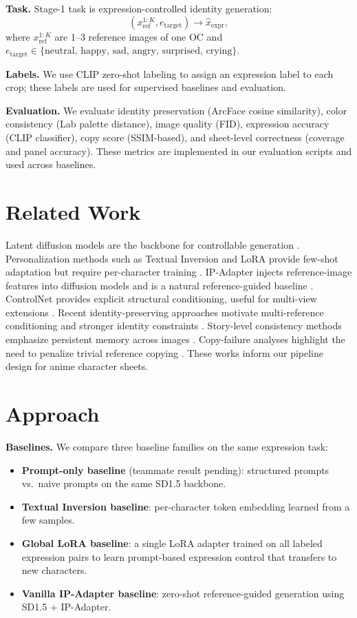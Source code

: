 \documentclass[twocolumn,11pt]{article}
\begin{document}
\textbf{Task.} Stage-1 task is expression-controlled identity generation:
\[
(x_{\mathrm{ref}}^{1:K}, e_{\mathrm{target}})\rightarrow \hat{x}_{\mathrm{expr}},
\]
where $x_{\mathrm{ref}}^{1:K}$ are 1--3 reference images of one OC and $e_{\mathrm{target}} \in \{\text{neutral, happy, sad, angry, surprised, crying}\}$.

\textbf{Labels.} We use CLIP zero-shot labeling to assign an expression label to each crop; these labels are used for supervised baselines and evaluation.

\textbf{Evaluation.} We evaluate identity preservation (ArcFace cosine similarity), color consistency (Lab palette distance), image quality (FID), expression accuracy (CLIP classifier), copy score (SSIM-based), and sheet-level correctness (coverage and panel accuracy). These metrics are implemented in our evaluation scripts and used across baselines.

\section{Related Work}
Latent diffusion models are the backbone for controllable generation \citep{rombach2022latent}. Personalization methods such as Textual Inversion and LoRA provide few-shot adaptation but require per-character training \citep{gal2022textual,hu2022lora}. IP-Adapter injects reference-image features into diffusion models and is a natural reference-guided baseline \citep{ye2023ipadapter}. ControlNet provides explicit structural conditioning, useful for multi-view extensions \citep{zhang2023controlnet}. Recent identity-preserving approaches motivate multi-reference conditioning and stronger identity constraints \citep{li2024photomaker,guo2024pulid,ma2024characteradapter}. Story-level consistency methods emphasize persistent memory across images \citep{zhou2024storydiffusion}. Copy-failure analyses highlight the need to penalize trivial reference copying \citep{xu2025withanyone}. These works inform our pipeline design for anime character sheets.

\section{Approach}
\textbf{Baselines.} We compare three baseline families on the same expression task:
\begin{itemize}[leftmargin=*,nosep]
    \item \textbf{Prompt-only baseline} (teammate result pending): structured prompts vs.\ naive prompts on the same SD1.5 backbone.
    \item \textbf{Textual Inversion baseline}: per-character token embedding learned from a few samples.
    \item \textbf{Global LoRA baseline}: a single LoRA adapter trained on all labeled expression pairs to learn prompt-based expression control that transfers to new characters.
    \item \textbf{Vanilla IP-Adapter baseline}: zero-shot reference-guided generation using SD1.5 + IP-Adapter.
\end{itemize}
\end{document}
